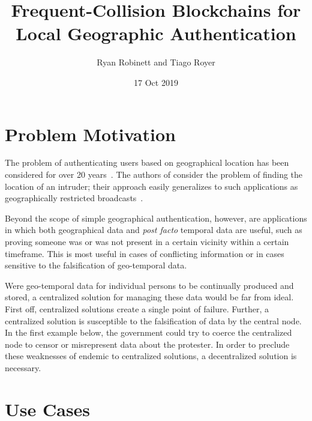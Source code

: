 \documentclass{article}
\title{Frequent-Collision Blockchains for Local Geographic Authentication}
\author{Ryan Robinett and Tiago Royer}
\date{17 Oct 2019}
\begin{document}
\maketitle

\section*{Problem Motivation}

The problem of authenticating users based on geographical location
has been considered for over 20 years~\cite{denning_1996}.
The authors of \cite{denning_1996} consider the problem of finding
the location of an intruder;
their approach easily generalizes to such applications as
geographically restricted broadcasts~\cite{gdpr}.

Beyond the scope of simple geographical authentication, however,
are applications in which both geographical data and \textit{post facto}
temporal data are useful, such as
proving someone was or was not present in a certain vicinity within a
certain timeframe.
This is most useful in cases of conflicting information or in cases sensitive to
the falsification of geo-temporal data.

Were geo-temporal data for individual persons to be continually produced and stored,
a centralized solution for managing these data would be far from ideal.
First off,
centralized solutions create a single point of failure.
Further,
a centralized solution is susceptible to the falsification of data
by the central node.
In the first example below,
the government could try to coerce the centralized node
to censor or misrepresent data about the protester.
In order to preclude these weaknesses of endemic to centralized solutions,
a decentralized solution is necessary.

\section*{Use Cases}
\end{document}
